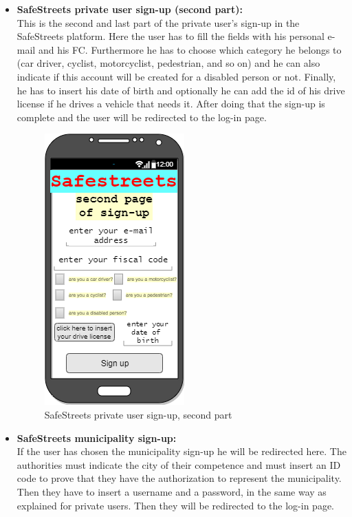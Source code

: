 \documentclass[titlepage]{article}
\begin{document}
\begin{itemize}
\begin{itemize}
	\newpage
	
	
	
	\item \textbf{SafeStreets private user sign-up (second part):}\\
	
	This is the second and last part of the private user's sign-up in the SafeStreets platform. Here the user has to fill the fields with his personal e-mail and his FC. Furthermore he has to choose  which category he belongs to (car driver, cyclist, motorcyclist, pedestrian, and so on) and he can also indicate if this account will be created for a disabled person or not. Finally, he has to insert his date of birth and optionally he can add the id of his drive license if he drives a vehicle that needs it. After doing that the sign-up is complete and the user will be redirected to the log-in page.
	
	\begin{figure}[h]
	\includegraphics[scale=0.8]{Mockups/second sign up.png}
	\centering
	\caption{SafeStreets private user sign-up, second part}
	\end{figure}
	\FloatBarrier
	
	\newpage	
	
	
	
	
	\item \textbf{SafeStreets municipality sign-up:}\\
	If the user has chosen the municipality sign-up he will be redirected here. The authorities must indicate the city of their competence and must insert an ID code to prove that they have the authorization to represent the municipality. Then they have to insert a username and a password, in the same way as explained for private users. Then they will be redirected to the log-in page.
	

\end{itemize}
\end{itemize}
\end{document}
